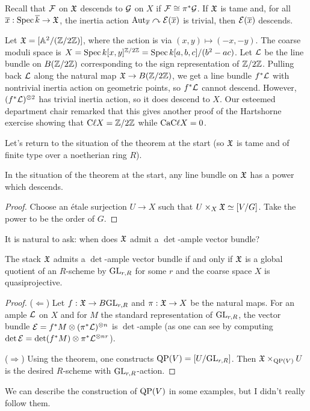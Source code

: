 \documentclass{amsart}
\begin{document}
Recall that $\mathcal{F}$ on $\mathfrak{X}$ descends to $\mathcal{G}$ on $X$ if $\mathcal{F} \cong \pi^* \mathcal{G}$.
If $\mathfrak{X}$ is tame and, for all $\overline{x}: \operatorname{Spec} \overline{k} \to \mathfrak{X}$, the inertia action $\operatorname{Aut}_{\overline{x}} \curvearrowright \mathcal{E}(\overline{x})$ is trivial, then $\mathcal{E}(\overline{x})$ descends.

\begin{ex}
	Let $\mathfrak{X} = [\mathbb{A}^2 / (\mathbb{Z} / 2\mathbb{Z})]$, where the action is via $(x, y) \mapsto (-x, -y)$.
	The coarse moduli space is $X = \operatorname{Spec} k[x, y]^{\mathbb{Z} / 2 \mathbb{Z}} = \operatorname{Spec} k[a, b, c] / (b^2 - ac)$.
	Let $\mathcal{L}$ be the line bundle on $B(\mathbb{Z} / 2 \mathbb{Z})$ corresponding to the sign representation of $\mathbb{Z} / 2 \mathbb{Z}$.
	Pulling back $\mathcal{L}$ along the natural map $\mathfrak{X} \to B(\mathbb{Z} / 2 \mathbb{Z})$, we get a line bundle $f^* \mathcal{L}$ with nontrivial inertia action on geometric points, so $f^* \mathcal{L}$ cannot descend.
	However, $(f^* \mathcal{L})^{\otimes 2}$ has trivial inertia action, so it does descend to $X$.
	Our esteemed department chair remarked that this gives another proof of the Hartshorne exercise showing that $\mathrm{C\ell} X = \mathbb{Z} / 2 \mathbb{Z}$ while $\mathrm{CaC\ell} X = 0$.
\end{ex}

Let's return to the situation of the theorem at the start (so $\mathfrak{X}$ is tame and of finite type over a noetherian ring $R$).

\begin{prop}
	In the situation of the theorem at the start, any line bundle on $\mathfrak{X}$ has a power which descends.
\end{prop}

\begin{proof}
	Choose an \'etale surjection $U \to X$ such that $U \times_X \mathfrak{X} \simeq [V / G]$.
	Take the power to be the order of $G$.
\end{proof}

It is natural to ask: when does $\mathfrak{X}$ admit a $\det$-ample vector bundle?

\begin{prop}
	The stack $\mathfrak{X}$ admits a $\det$-ample vector bundle if and only if $\mathfrak{X}$ is a global quotient of an $R$-scheme by $\mathrm{GL}_{r,R}$ for some $r$ and the coarse space $X$ is quasiprojective.
\end{prop}

\begin{proof}
	($\Leftarrow$) Let $f: \mathfrak{X} \to B\mathrm{GL}_{r,R}$ and $\pi: \mathfrak{X} \to X$ be the natural maps.
	For an ample $\mathcal{L}$ on $X$ and for $M$ the standard representation of $\mathrm{GL}_{r,R}$, the vector bundle $\mathcal{E} = f^* M \otimes (\pi^* \mathcal{L})^{\otimes n}$ is $\det$-ample (as one can see by computing $\det \mathcal{E} = \det (f^* M) \otimes \pi^* \mathcal{L}^{\otimes n r}$).

	($\Rightarrow$) Using the theorem, one constructs $\mathrm{QP}(V) = [U / \mathrm{GL}_{r,R}]$.
	Then $\mathfrak{X} \times_{\mathrm{QP}(V)} U$ is the desired $R$-scheme with $\mathrm{GL}_{r,R}$-action.
\end{proof}

We can describe the construction of $\mathrm{QP}(V)$ in some examples, but I didn't really follow them.
\end{document}
